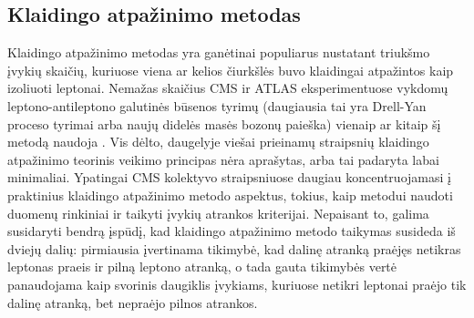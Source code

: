 \documentclass[a4paper, 12pt, oneside]{article}
\begin{document}
\subsection{Klaidingo atpažinimo metodas}\label{sec:FR}
Klaidingo atpažinimo metodas yra ganėtinai populiarus nustatant triukšmo įvykių skaičių, kuriuose viena ar kelios čiurkšlės
buvo klaidingai atpažintos kaip izoliuoti leptonai.
Nemažas skaičius CMS ir ATLAS eksperimentuose vykdomų leptono-antileptono galutinės būsenos tyrimų (daugiausia tai yra
Drell-Yan proceso tyrimai arba naujų didelės masės bozonų paieška) vienaip ar kitaip šį metodą naudoja
\cite{DY_CMS2011, DY_CMS2013, DY_ATLAS2013, DY_CMS2015, DY_ATLAS2016, DY_CMS2019, Z'_ATLAS2011, Z'_CMS2011, Z'_CMS2012,
Z'_CMS2013, Z'_ATLAS2014, Z'_CMS2015, Z'_CMS2017, Z'_CMS2018}.
Vis dėlto, daugelyje viešai prieinamų straipsnių klaidingo atpažinimo teorinis veikimo principas nėra aprašytas, arba tai padaryta
labai minimaliai.
Ypatingai CMS kolektyvo straipsniuose daugiau koncentruojamasi į praktinius klaidingo atpažinimo metodo aspektus, tokius,
kaip metodui naudoti duomenų rinkiniai ir taikyti įvykių atrankos kriterijai.
Nepaisant to, galima susidaryti bendrą įspūdį, kad klaidingo atpažinimo metodo taikymas susideda iš dviejų dalių:
pirmiausia įvertinama tikimybė, kad dalinę atranką praėjęs netikras leptonas praeis ir pilną leptono atranką, o tada gauta
tikimybės vertė panaudojama kaip svorinis daugiklis įvykiams, kuriuose netikri leptonai praėjo tik dalinę atranką, bet 
nepraėjo pilnos atrankos.
\end{document}
